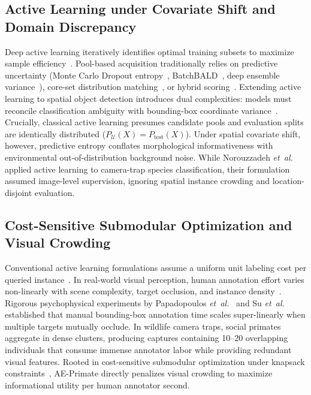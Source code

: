 \documentclass[conference]{IEEEtran}
\begin{document}
\subsection{Active Learning under Covariate Shift and Domain Discrepancy}
Deep active learning iteratively identifies optimal training subsets to maximize sample efficiency~\cite{settles2009active,ren2021survey}. Pool-based acquisition traditionally relies on predictive uncertainty (Monte Carlo Dropout entropy~\cite{gal2016dropout,gal2017deep}, BatchBALD~\cite{kirsch2019batchbald}, deep ensemble variance~\cite{beluch2018power}), core-set distribution matching~\cite{sener2018active,sinha2019variational,kim2021task}, or hybrid scoring~\cite{choi2021active}. Extending active learning to spatial object detection introduces dual complexities: models must reconcile classification ambiguity with bounding-box coordinate variance~\cite{kao2018localization,choi2021active,aghdam2019active,yuan2021multiple,yu2022consistency}. Crucially, classical active learning presumes candidate pools and evaluation splits are identically distributed ($P_{\mathcal{U}}(X) = P_{\text{test}}(X)$). Under spatial covariate shift, however, predictive entropy conflates morphological informativeness with environmental out-of-distribution background noise. While Norouzzadeh \textit{et~al.}~\cite{norouzzadeh2021deep} applied active learning to camera-trap species classification, their formulation assumed image-level supervision, ignoring spatial instance crowding and location-disjoint evaluation.

\subsection{Cost-Sensitive Submodular Optimization and Visual Crowding}
Conventional active learning formulations assume a uniform unit labeling cost per queried instance~\cite{settles2009active,sener2018active}. In real-world visual perception, human annotation effort varies non-linearly with scene complexity, target occlusion, and instance density~\cite{vijayanarasimhan2009what,settles2008multiple}. Rigorous psychophysical experiments by Papadopoulos \textit{et~al.}~\cite{papadopoulos2017training,papadopoulos2017extreme} and Su \textit{et~al.}~\cite{su2012crowdsourcing} established that manual bounding-box annotation time scales super-linearly when multiple targets mutually occlude. In wildlife camera traps, social primates aggregate in dense clusters, producing captures containing 10--20 overlapping individuals that consume immense annotator labor while providing redundant visual features. Rooted in cost-sensitive submodular optimization under knapsack constraints~\cite{iyer2013submodular}, AE-Primate directly penalizes visual crowding to maximize informational utility per human annotator second.
\end{document}
